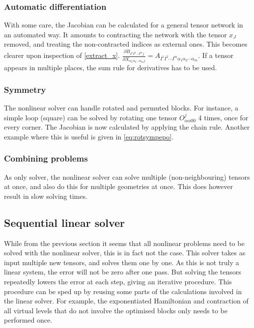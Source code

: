 \subsubsection{Automatic differentiation}
With some care, the Jacobian can be calculated for a general tensor network in an automated way. It amounts to  contracting the network with the tensor $x_J$ removed, and treating the non-contracted indices as external ones. This becomes clearer upon inspection of \cref{extract_x}. $  \frac{ \partial B_{I^1 I^2 \cdots I^m  j } }{  \partial X_{\alpha_1 \alpha_2 \cdots \alpha_m j } } =  A_{I^1 I^2 \cdots I^m  \alpha_1 \alpha_2 \cdots \alpha_m }{}$. If a tensor appears in multiple places, the sum rule for derivatives has to be used.


\subsubsection{Symmetry}

The nonlinear solver can handle rotated and permuted blocks. For instance, a simple loop (square) can be solved by rotating one tensor $O^{j }_{ \alpha \alpha 0 0}$ 4 times, once for every corner. The Jacobian is now calculated by applying the chain rule. Another example where this is useful is given in \cref{eq:rotsympepo}.

\subsubsection{Combining problems}
As only solver, the nonlinear solver can solve multiple (non-neighbouring) tensors at once, and also do this for multiple geometries at once. This does however result in slow solving times.

\subsection{Sequential linear solver}
While from the previous section it seems that all nonlinear problems need to be solved with the nonlinear solver, this is in fact not the case. This solver takes as input multiple new tensors, and solves them one by one. As this is not truly a linear system, the error will not be zero after one pass. But solving the tensors repeatedly lowers the error at each step, giving an iterative procedure. This procedure can be sped up by reusing some parts of the calculations involved in the linear solver. For example, the exponentiated Hamiltonian and contraction of all virtual levels that do not involve the optimised blocks only needs to be performed once.

